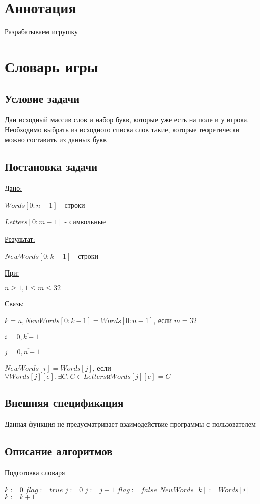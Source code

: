 \documentclass[a4paper,14pt]{article}
\begin{document}

\tableofcontents
\pagebreak
\section{Аннотация}
	Разрабатываем игрушку
	\pagebreak
\section{Словарь игры}
	\subsection{Условие задачи}
	Дан исходный массив слов и набор букв, которые уже есть на поле и у игрока. Необходимо выбрать из исходного списка слов такие, которые теоретически можно составить из данных букв
	\subsection{Постановка задачи}
	\underline{Дано:}
	
	$Words[0:n-1]$ - строки
	
	$Letters[0:m-1]$ - символьные
	
	\underline{Результат:}
	
	$NewWords[0:k-1]$ - строки
	
	\underline{При:}
	
	$n \ge 1, 1 \le m \le 32$
	
	\underline{Связь:}
	
	$k = n, NewWords[0:k-1] = Words[0:n-1]$, если $m = 32$ 
	
	$i=\overline{0, k-1}$
	
	$j=\overline{0, n-1}$
	
	$NewWords[i] = Words[j]$, если $\forall Words[j][e], \exists C, C \in Letters и Words[j][e] = C $
	
	\subsection{Внешняя спецификация}
	Данная функция не предусматривает взаимодействие программы с пользователем
	\pagebreak
	\subsection{Описание алгоритмов}	
	\begin{algorithm*}[!htp]
	\caption{Подготовка словаря}
	\begin{algorithmic}
		\State $k := 0$
			\State $flag := true$
			\State $j := 0$
					\State $j := j + 1$
				\Else
					\State $flag := false$
				\EndIf				
			\EndWhile
				\State $NewWords[k] := Words[i]$
				\State $k := k + 1$
			\EndIf
		\EndFor
	\end{algorithmic}
	\end{algorithm*}
\end{document}
